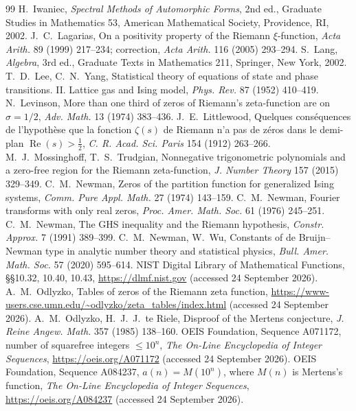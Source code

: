 \documentclass[11pt]{article}
\theoremstyle{definition}\newtheorem{definition}[theorem]{Definition}
\theoremstyle{remark}\newtheorem{remark}[theorem]{Remark}
\renewcommand{\Re}{\operatorname{Re}}\renewcommand{\Im}{\operatorname{Im}}
\begin{document}
\begin{thebibliography}{99}
 H.~Iwaniec, \emph{Spectral Methods of Automorphic Forms}, 2nd ed., Graduate Studies in Mathematics 53, American Mathematical Society, Providence, RI, 2002.
 J.~C.~Lagarias, On a positivity property of the Riemann $\xi$-function, \emph{Acta Arith.} 89 (1999) 217--234; correction, \emph{Acta Arith.} 116 (2005) 293--294.
 S.~Lang, \emph{Algebra}, 3rd ed., Graduate Texts in Mathematics 211, Springer, New York, 2002.
 T.~D.~Lee, C.~N.~Yang, Statistical theory of equations of state and phase transitions. II. Lattice gas and Ising model, \emph{Phys. Rev.} 87 (1952) 410--419.
 N.~Levinson, More than one third of zeros of Riemann's zeta-function are on $\sigma=1/2$, \emph{Adv. Math.} 13 (1974) 383--436.
 J.~E.~Littlewood, Quelques cons\'equences de l'hypoth\`ese que la fonction $\zeta(s)$ de Riemann n'a pas de z\'eros dans le demi-plan $\Re(s)>\frac12$, \emph{C. R. Acad. Sci. Paris} 154 (1912) 263--266.
 M.~J.~Mossinghoff, T.~S.~Trudgian, Nonnegative trigonometric polynomials and a zero-free region for the Riemann zeta-function, \emph{J. Number Theory} 157 (2015) 329--349.
 C.~M.~Newman, Zeros of the partition function for generalized Ising systems, \emph{Comm. Pure Appl. Math.} 27 (1974) 143--159.
 C.~M.~Newman, Fourier transforms with only real zeros, \emph{Proc. Amer. Math. Soc.} 61 (1976) 245--251.
 C.~M.~Newman, The GHS inequality and the Riemann hypothesis, \emph{Constr. Approx.} 7 (1991) 389--399.
 C.~M.~Newman, W.~Wu, Constants of de Bruijn--Newman type in analytic number theory and statistical physics, \emph{Bull. Amer. Math. Soc.} 57 (2020) 595--614.
 NIST Digital Library of Mathematical Functions, \S\S10.32, 10.40, 10.43, \url{https://dlmf.nist.gov} (accessed 24 September 2026).
 A.~M.~Odlyzko, Tables of zeros of the Riemann zeta function, \url{https://www-users.cse.umn.edu/~odlyzko/zeta_tables/index.html} (accessed 24 September 2026).
 A.~M.~Odlyzko, H.~J.~J.~te Riele, Disproof of the Mertens conjecture, \emph{J. Reine Angew. Math.} 357 (1985) 138--160.
 OEIS Foundation, Sequence A071172, number of squarefree integers $\le10^n$, \emph{The On-Line Encyclopedia of Integer Sequences}, \url{https://oeis.org/A071172} (accessed 24 September 2026).
 OEIS Foundation, Sequence A084237, $a(n)=M(10^n)$, where $M(n)$ is Mertens's function, \emph{The On-Line Encyclopedia of Integer Sequences}, \url{https://oeis.org/A084237} (accessed 24 September 2026).

\end{thebibliography}
\end{document}
